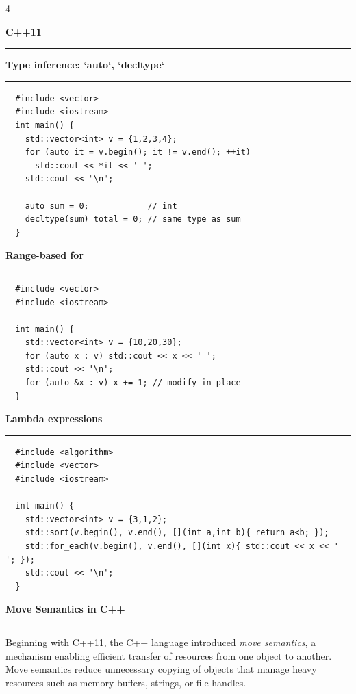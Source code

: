 \documentclass[final]{beamer}
\renewcommand{\section}[1]{%
  \par\vspace{1em}%
  {\noindent\Large\bfseries #1\par}%
  \vspace{0.5em}\hrule\vspace{1em}%
}
\renewcommand{\subsection}[1]{%
  \par\vspace{1em}%
  {\noindent\large\bfseries #1\par}%
  \vspace{0.5em}\hrule\vspace{1em}%
}
\begin{document}
\begin{frame}[t,fragile]
\begin{multicols}{4}
 \section{C++11}

  \subsection{Type inference: `auto`, `decltype`}

  \begin{lstlisting}
  #include <vector>
  #include <iostream>
  int main() {
    std::vector<int> v = {1,2,3,4};
    for (auto it = v.begin(); it != v.end(); ++it)
      std::cout << *it << ' ';
    std::cout << "\n";

    auto sum = 0;            // int
    decltype(sum) total = 0; // same type as sum
  }
  \end{lstlisting}

   \subsection{Range-based for}

  \begin{lstlisting}
  #include <vector>
  #include <iostream>

  int main() {
    std::vector<int> v = {10,20,30};
    for (auto x : v) std::cout << x << ' ';
    std::cout << '\n';
    for (auto &x : v) x += 1; // modify in-place
  }
  \end{lstlisting}

  \subsection{Lambda expressions}
 
  \begin{lstlisting}
  #include <algorithm>
  #include <vector>
  #include <iostream>

  int main() {
    std::vector<int> v = {3,1,2};
    std::sort(v.begin(), v.end(), [](int a,int b){ return a<b; });
    std::for_each(v.begin(), v.end(), [](int x){ std::cout << x << ' '; });
    std::cout << '\n';
  }
  \end{lstlisting}


   \section{Move Semantics in C++}

  Beginning with C++11, the C++ language introduced \textit{move semantics}, a mechanism enabling efficient transfer of resources from one object to another. Move semantics reduce unnecessary copying of objects that manage heavy resources such as memory buffers, strings, or file handles.


\end{multicols}
\end{frame}
\end{document}
